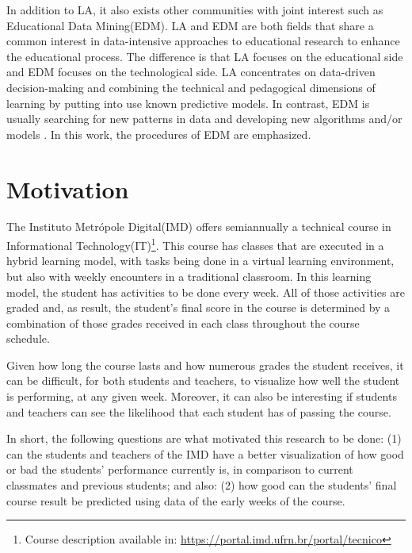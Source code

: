 In addition to LA, it also exists other communities with joint interest such as Educational Data Mining(EDM). LA and EDM are both fields that share a common interest in data-intensive approaches to educational research to enhance the educational process. The difference is that LA focuses on the educational side and EDM focuses on the technological side. LA concentrates on data-driven decision-making and combining the technical and pedagogical dimensions of learning by putting into use known predictive models. In contrast, EDM is usually searching for new patterns in data and developing new algorithms and/or models \cite{romero2020educational}. In this work, the procedures of EDM are emphasized.

\section{Motivation}

The Instituto Metrópole Digital(IMD) offers semiannually a technical course in Informational Technology(IT)\footnote[1]{\hspace{1mm}Course description available in: \url{https://portal.imd.ufrn.br/portal/tecnico}}. This course has classes that are executed in a hybrid learning model, with tasks being done in a virtual learning environment, but also with weekly encounters in a traditional classroom. In this learning model, the student has activities to be done every week. All of those activities are graded and, as result, the student's final score in the course is determined by a combination of those grades received in each class throughout the course schedule.

Given how long the course lasts and how numerous grades the student receives, it can be difficult, for both students and teachers, to visualize how well the student is performing, at any given week. Moreover, it can also be interesting if students and teachers can see the likelihood that each student has of passing the course.

In short, the following questions are what motivated this research to be done: (1) can the students and teachers of the IMD have a better visualization of how good or bad the students' performance currently is, in comparison to current classmates and previous students; and also: (2) how good can the students' final course result be predicted using data of the early weeks of the course.

